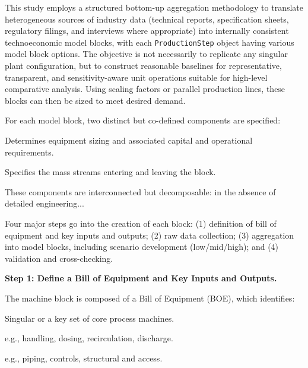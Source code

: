 \documentclass{article}
\renewcommand\_{\textunderscore\allowbreak}
\begin{document}
This study employs a structured bottom-up aggregation methodology to translate heterogeneous sources of industry data (technical reports, specification sheets, regulatory filings, and interviews where appropriate) into internally consistent technoeconomic model blocks, with each \texttt{ProductionStep} object having various model block options. The objective is not necessarily to replicate any singular plant configuration, but to construct reasonable baselines for representative, transparent, and sensitivity-aware unit operations suitable for high-level comparative analysis. Using scaling factors or parallel production lines, these  blocks can then be sized to meet desired demand.

For each model block, two distinct but co-defined components are specified:

\begin{description}[noitemsep, topsep=0pt]
    \item[\textbullet\enskip Machine block options] Determines equipment sizing and associated capital and operational requirements.
    \item[\textbullet\enskip Input and output materials] Specifies the mass streams entering  and leaving the block.
\end{description}

These components are interconnected but decomposable: in the absence of detailed engineering...

Four major steps go into the creation of each block: (1) definition of bill of equipment and key inputs and outputs; (2) raw data collection; (3) aggregation into model blocks, including scenario development (low/mid/high);  and (4) validation and cross-checking.

\medskip
\noindent\textbf{Step 1: Define a Bill of Equipment and Key Inputs and Outputs.}\quad

The machine block is composed of a Bill of Equipment (BOE), which identifies:

\begin{description}[noitemsep, topsep=0pt]
    \item[\textbullet\enskip Primary process equipment] Singular or a key set of core process machines.
    \item[\textbullet\enskip Required secondary systems] e.g., handling, dosing, recirculation, discharge.
    \item[\textbullet\enskip Balance-of-plant auxiliary elements] e.g., piping, controls, structural and access.
\end{description}
\end{document}
